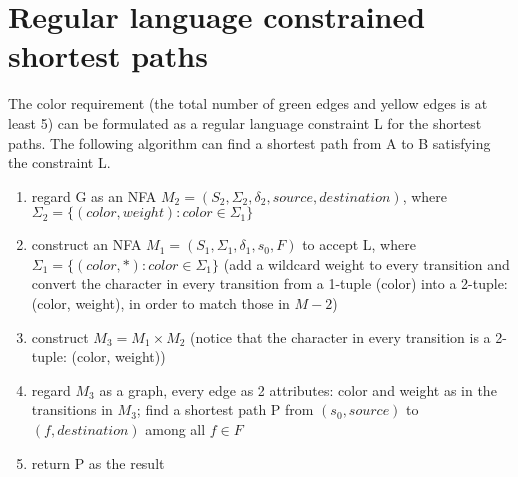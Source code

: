 \documentclass{article}
\begin{document}
\section{Regular language constrained shortest paths}
The color requirement (the total number of green edges and yellow edges is at
least 5) can be formulated as a regular language constraint L for the shortest
paths. The following algorithm can find a shortest path from A to B satisfying
the constraint L.
\begin{enumerate}
  \item regard G as an NFA $M_2 = (S_2, \Sigma_2, \delta_2, source,
  destination)$, where $\Sigma_2 = \{(color, weight): color \in \Sigma_1\}$
  \item construct an NFA $M_1 = (S_1, \Sigma_1, \delta_1, s_0, F)$ to accept
  L, where $\Sigma_1 = \{(color, *): color \in \Sigma_1\}$ (add a wildcard
  weight to every transition and convert the character in every transition from
  a 1-tuple (color) into a 2-tuple: (color, weight), in order to match those in
  $M-2$)
  \item construct $M_3 = M_1 \times M_2$ (notice that the character in every
  transition is a 2-tuple: (color, weight))
  \item regard $M_3$ as a graph, every edge as 2 attributes: color and weight
  as in the transitions in $M_3$; find a shortest path P from $(s_0, source)$ to
  $(f, destination)$ among all $f \in F$
  \item return P as the result

\end{enumerate}
\end{document}
